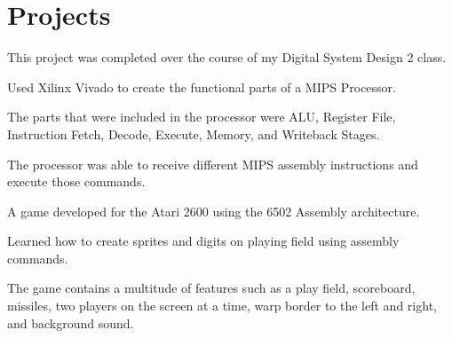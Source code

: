 \documentclass[a4paper]{comcv}
\begin{document}


\section{Projects}


\smallskip
    \begin{tightlist}
        \item This project was completed over the course of my Digital System Design 2 class.
        \item Used Xilinx Vivado to create the functional parts of a MIPS Processor.
        \item The parts that were included in the processor were ALU, Register File, Instruction Fetch, Decode, Execute, Memory, and Writeback Stages.
        \item The processor was able to receive different MIPS assembly instructions and execute those commands.
\end{tightlist}

\vspace{\topsep}
\vspace{\topsep}
    \begin{tightlist}
        \item A game developed for the Atari 2600 using the 6502 Assembly architecture.
        \item Learned how to create sprites and digits on playing field using assembly commands.
        \item The game contains a multitude of features such as a play field, scoreboard, missiles, two players on the screen at a time, warp border to the left and right, and background sound.
\end{tightlist}


\end{document}
